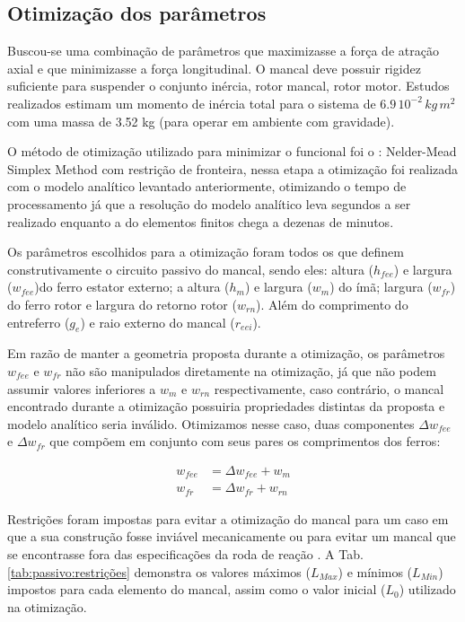 
\subsection{Otimização dos parâmetros}

Buscou-se uma combinação de parâmetros que maximizasse a força de atração axial e que minimizasse a força longitudinal. O mancal deve possuir rigidez suficiente para suspender o conjunto inércia, rotor mancal, rotor motor. Estudos realizados estimam um momento de inércia total para o sistema de $6.9 \, 10^{-2} \, kg \, m^2$ com uma massa de 3.52 kg (para operar em ambiente com gravidade). 

O método de otimização utilizado para minimizar o funcional foi o :  Nelder-Mead Simplex Method com restrição de fronteira,  nessa etapa a otimização foi realizada com o modelo analítico levantado anteriormente, otimizando o tempo de processamento já que a resolução do modelo analítico leva segundos a ser realizado enquanto a do elementos finitos chega a dezenas de minutos.

Os parâmetros escolhidos para a otimização foram todos os que definem construtivamente o circuito passivo do mancal, sendo eles: altura  ($h_{fee}$) e largura  ($w_{fee}$)do ferro estator externo; a altura ($h_m$) e largura ($w_m$) do ímã;  largura ($w_{fr}$) do ferro rotor e largura do retorno rotor ($w_{rn}$). Além do comprimento do entreferro ($g_e$) e raio externo do mancal ($r_{eei}$).

Em razão de manter a geometria proposta durante a otimização, os parâmetros $w_{fee}$ e $w_{fr}$ não são manipulados diretamente na otimização, já que não podem assumir valores inferiores a $w_m$ e $w_{rn}$ respectivamente, caso contrário, o mancal encontrado durante a otimização possuiria propriedades distintas da proposta e modelo analítico seria inválido. Otimizamos nesse caso, duas componentes $\Delta w_{fee}$ e $\Delta w_{fr}$ que compõem em conjunto com seus pares os comprimentos dos ferros:

\begin{align}
	w_{fee}  &= \Delta w_{fee} + w_m \\
	w_{fr} &= \Delta w_{fr} + w_{rn}
\end{align}	

Restrições foram impostas para evitar a otimização do mancal para um caso em que a sua construção fosse inviável mecanicamente ou para evitar um mancal que se encontrasse fora das especificações da roda de reação . A Tab. \ref{tab:passivo:restrições} demonstra os valores máximos ($L_{Max}$) e mínimos ($L_{Min}$) impostos para cada elemento do mancal, assim como o valor inicial ($L_0$) utilizado na otimização.


